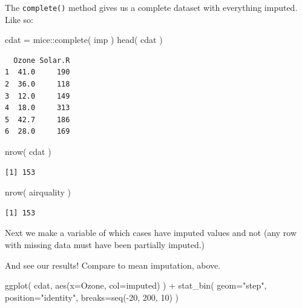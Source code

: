 \documentclass[
  letterpaper,
  DIV=11,
  numbers=noendperiod]{scrreprt}
\newenvironment{Shaded}{\begin{snugshade}}{\end{snugshade}}
\newcommand{\AttributeTok}[1]{\textcolor[rgb]{0.49,0.56,0.16}{#1}}
\newcommand{\DecValTok}[1]{\textcolor[rgb]{0.25,0.63,0.44}{#1}}
\newcommand{\FunctionTok}[1]{\textcolor[rgb]{0.02,0.16,0.49}{#1}}
\newcommand{\NormalTok}[1]{\textcolor[rgb]{0.00,0.44,0.13}{#1}}
\newcommand{\OtherTok}[1]{\textcolor[rgb]{0.00,0.44,0.13}{#1}}
\newcommand{\SpecialCharTok}[1]{\textcolor[rgb]{0.25,0.44,0.63}{#1}}
\newcommand{\StringTok}[1]{\textcolor[rgb]{0.25,0.44,0.63}{#1}}
\begin{document}
The \texttt{complete()} method gives us a complete dataset with
everything imputed. Like so:

\begin{Shaded}
\begin{Highlighting}[]
\NormalTok{  cdat }\OtherTok{=}\NormalTok{ mice}\SpecialCharTok{::}\FunctionTok{complete}\NormalTok{( imp )}
  \FunctionTok{head}\NormalTok{( cdat )}
\end{Highlighting}
\end{Shaded}

\begin{verbatim}
  Ozone Solar.R
1  41.0     190
2  36.0     118
3  12.0     149
4  18.0     313
5  42.7     186
6  28.0     169
\end{verbatim}

\begin{Shaded}
\begin{Highlighting}[]
  \FunctionTok{nrow}\NormalTok{( cdat )}
\end{Highlighting}
\end{Shaded}

\begin{verbatim}
[1] 153
\end{verbatim}

\begin{Shaded}
\begin{Highlighting}[]
  \FunctionTok{nrow}\NormalTok{( airquality )}
\end{Highlighting}
\end{Shaded}

\begin{verbatim}
[1] 153
\end{verbatim}

Next we make a variable of which cases have imputed values and not (any
row with missing data must have been partially imputed.)

\begin{Shaded}
\end{Shaded}

And see our results! Compare to mean imputation, above.

\begin{Shaded}
\begin{Highlighting}[]
\FunctionTok{ggplot}\NormalTok{( cdat, }\FunctionTok{aes}\NormalTok{(}\AttributeTok{x=}\NormalTok{Ozone, }\AttributeTok{col=}\NormalTok{imputed) ) }\SpecialCharTok{+}
    \FunctionTok{stat\_bin}\NormalTok{( }\AttributeTok{geom=}\StringTok{"step"}\NormalTok{, }\AttributeTok{position=}\StringTok{"identity"}\NormalTok{,}
              \AttributeTok{breaks=}\FunctionTok{seq}\NormalTok{(}\SpecialCharTok{{-}}\DecValTok{20}\NormalTok{, }\DecValTok{200}\NormalTok{, }\DecValTok{10}\NormalTok{) )}
\end{Highlighting}
\end{Shaded}
\end{document}
